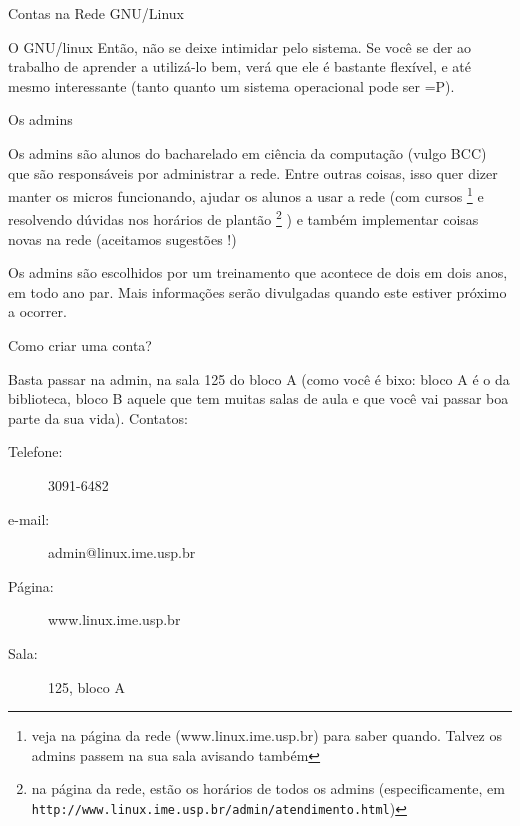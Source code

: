 \begin{secao}{Contas na Rede GNU/Linux}
\begin{subsecao}{O GNU/linux }
Então, não se deixe intimidar pelo sistema. Se você se der ao trabalho de
aprender a utilizá-lo bem, verá que ele é bastante flexível, e até mesmo
interessante (tanto quanto um sistema operacional pode ser =P).

\end{subsecao}

\begin{subsecao}{Os admins}

Os admins são alunos do bacharelado em ciência da computação (vulgo BCC) que
são responsáveis por administrar a rede. Entre outras coisas, isso quer dizer
manter os micros funcionando, ajudar os alunos a usar a rede (com
cursos \footnote{ veja na página da rede (www.linux.ime.usp.br) para saber
quando. Talvez os admins passem na sua sala avisando também} e resolvendo
dúvidas nos horários de plantão \footnote{na página da rede, estão os horários
de todos os admins (especificamente, em {\tt http://www.linux.ime.usp.br/admin/atendimento.html})}
) e também implementar coisas novas na rede (aceitamos sugestões !)

Os admins são escolhidos por um treinamento que acontece de dois em dois anos,
em todo ano par. Mais informações serão divulgadas quando este estiver próximo
a ocorrer.

\end{subsecao}
\begin{subsecao}{Como criar uma conta?}

Basta passar na admin, na sala 125 do bloco A (como você é bixo: bloco A é o da
biblioteca, bloco B aquele que tem muitas salas de aula e que você vai passar boa 
parte da sua vida). Contatos:
\begin{description}

\item [Telefone:] 3091-6482
\item [e-mail:] admin@linux.ime.usp.br
\item [Página:] www.linux.ime.usp.br
\item [Sala:] 125, bloco A

\end{description}
\end{subsecao}
\end{secao}

